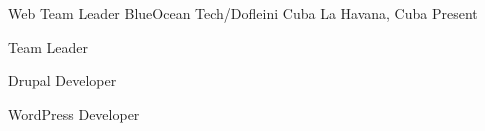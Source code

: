 


\begin{cventries}


\cventry
{Web Team Leader} %
{BlueOcean Tech/Dofleini Cuba} %
{La Havana, Cuba} %
{Present} %
{ %
\begin{cvitems}
\item {Team Leader}
\item {Drupal Developer}
\item {WordPress Developer}
\end{cvitems}
}


\end{cventries}

